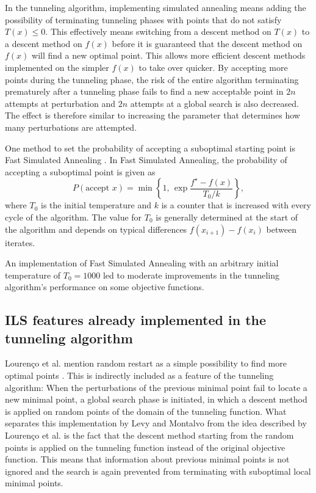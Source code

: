 \documentclass[a4paper,12pt,twoside]{article}
\begin{document}
In the tunneling algorithm, implementing simulated annealing means adding the possibility of terminating tunneling phases with points that do not satisfy $T(x) \leq 0$. This effectively means switching from a descent method on $T(x)$ to a descent method on $f(x)$ before it is guaranteed that the descent method on $f(x)$ will find a new optimal point. This allows more efficient descent methods implemented on the simpler $f(x)$ to take over quicker. By accepting more points during the tunneling phase, the risk of the entire algorithm terminating prematurely after a tunneling phase fails to find a new acceptable point in $2n$ attempts at perturbation and $2n$ attempts at a global search is also decreased. The effect is therefore similar to increasing the parameter that determines how many perturbations are attempted.

One method to set the probability of accepting a suboptimal starting point is Fast Simulated Annealing \cite{szu_fast_1987}. In Fast Simulated Annealing, the probability of accepting a suboptimal point is given as
\begin{equation} \label{eq:p_annealing}
P(\text{accept } x) = \min \left\{1, \, \exp{\frac{f^\star - f(x)}{T_0/k}} \right\},
\end{equation}
where $T_0$ is the initial temperature and $k$ is a counter that is increased with every cycle of the algorithm. The value for $T_0$ is generally determined at the start of the algorithm and depends on typical differences $f(x_{i+1})-f(x_i)$ between iterates.

An implementation of Fast Simulated Annealing with an arbitrary initial temperature of $T_0 = 1000$ led to moderate improvements in the tunneling algorithm's performance on some objective functions.


\subsection{ILS features already implemented in the tunneling algorithm}
Lourenço et al. mention random restart as a simple possibility to find more optimal points \cite[\S 5.2.2]{lourenco_iterated_2003}. This is indirectly included as a feature of the tunneling algorithm: When the perturbations of the previous minimal point fail to locate a new minimal point, a global search phase is initiated, in which a descent method is applied on random points of the domain of the tunneling function. What separates this implementation by Levy and Montalvo from the idea described by Lourenço et al. is the fact that the descent method starting from the random points is applied on the tunneling function instead of the original objective function. This means that information about previous minimal points is not ignored and the search is again prevented from terminating with suboptimal local minimal points. 
\end{document}
